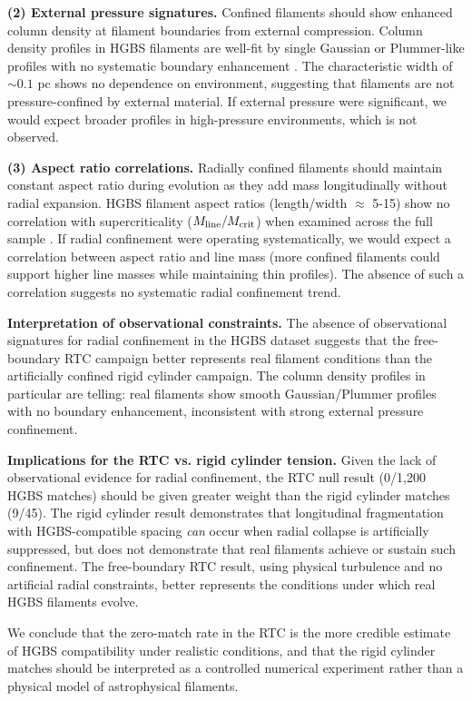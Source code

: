 \documentclass[twocolumn,usenatbib]{mnras}
\begin{document}
\textbf{(2) External pressure signatures.}
Confined filaments should show enhanced column density at filament boundaries from external compression. Column density profiles in HGBS filaments are well-fit by single Gaussian or Plummer-like profiles with no systematic boundary enhancement \citep{Arzoumanian2011}. The characteristic width of $\sim0.1$ pc shows no dependence on environment, suggesting that filaments are not pressure-confined by external material. If external pressure were significant, we would expect broader profiles in high-pressure environments, which is not observed.

\textbf{(3) Aspect ratio correlations.}
Radially confined filaments should maintain constant aspect ratio during evolution as they add mass longitudinally without radial expansion. HGBS filament aspect ratios (length/width $\approx$ 5-15) show no correlation with supercriticality ($M_{\rm line}/M_{\rm crit}$) when examined across the full sample \citep{Arzoumanian2019}. If radial confinement were operating systematically, we would expect a correlation between aspect ratio and line mass (more confined filaments could support higher line masses while maintaining thin profiles). The absence of such a correlation suggests no systematic radial confinement trend.

\textbf{Interpretation of observational constraints.}
The absence of observational signatures for radial confinement in the HGBS dataset suggests that the free-boundary RTC campaign better represents real filament conditions than the artificially confined rigid cylinder campaign. The column density profiles in particular are telling: real filaments show smooth Gaussian/Plummer profiles with no boundary enhancement, inconsistent with strong external pressure confinement.

\textbf{Implications for the RTC vs. rigid cylinder tension.}
Given the lack of observational evidence for radial confinement, the RTC null result (0/1,200 HGBS matches) should be given greater weight than the rigid cylinder matches (9/45). The rigid cylinder result demonstrates that longitudinal fragmentation with HGBS-compatible spacing \textit{can} occur when radial collapse is artificially suppressed, but does not demonstrate that real filaments achieve or sustain such confinement. The free-boundary RTC result, using physical turbulence and no artificial radial constraints, better represents the conditions under which real HGBS filaments evolve.

We conclude that the zero-match rate in the RTC is the more credible estimate of HGBS compatibility under realistic conditions, and that the rigid cylinder matches should be interpreted as a controlled numerical experiment rather than a physical model of astrophysical filaments.
\end{document}
